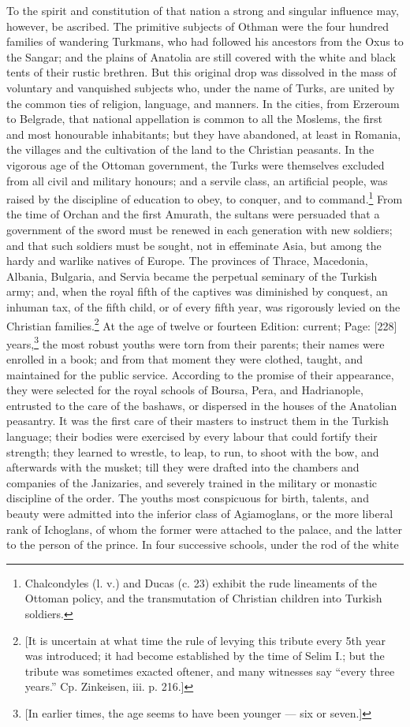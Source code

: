 To the spirit and constitution of that nation a strong and singular influence may, however, be ascribed. The primitive subjects of Othman were the four hundred families of wandering Turkmans, who had followed his ancestors from the Oxus to the Sangar; and the plains of Anatolia are still covered with the white and black tents of their rustic brethren. But this original drop was dissolved in the mass of voluntary and vanquished subjects who, under the name of Turks, are united by the common ties of religion, language, and manners. In the cities, from Erzeroum to Belgrade, that national appellation is common to all the Moslems, the first and most honourable inhabitants; but they have abandoned, at least in Romania, the villages and the cultivation of the land to the Christian peasants. In the vigorous age of the Ottoman government, the Turks were themselves excluded from all civil and military honours; and a servile class, an artificial people, was raised by the discipline of education to obey, to conquer, and to command.\footnote{Chalcondyles (l. v.) and Ducas (c. 23) exhibit the rude lineaments of the Ottoman policy, and the transmutation of Christian children into Turkish soldiers.} From the time of Orchan and the first Amurath, the sultans were persuaded that a government of the sword must be renewed in each generation with new soldiers; and that such soldiers must be sought, not in effeminate Asia, but among the hardy and warlike natives of Europe. The provinces of Thrace, Macedonia, Albania, Bulgaria, and Servia became the perpetual seminary of the Turkish army; and, when the royal fifth of the captives was diminished by conquest, an inhuman tax, of the fifth child, or of every fifth year, was rigorously levied on the Christian families.\footnote{[It is uncertain at what time the rule of levying this tribute every 5th year was introduced; it had become established by the time of Selim I.; but the tribute was sometimes exacted oftener, and many witnesses say \texthebrew{“}every three years.\texthebrew{}” Cp. Zinkeisen, iii. p. 216.]} At the age of twelve or fourteen Edition: current; Page: [228] years,\footnote{[In earlier times, the age seems to have been younger \texthebrew{—} six or seven.]} the most robust youths were torn from their parents; their names were enrolled in a book; and from that moment they were clothed, taught, and maintained for the public service. According to the promise of their appearance, they were selected for the royal schools of Boursa, Pera, and Hadrianople, entrusted to the care of the bashaws, or dispersed in the houses of the Anatolian peasantry. It was the first care of their masters to instruct them in the Turkish language; their bodies were exercised by every labour that could fortify their strength; they learned to wrestle, to leap, to run, to shoot with the bow, and afterwards with the musket; till they were drafted into the chambers and companies of the Janizaries, and severely trained in the military or monastic discipline of the order. The youths most conspicuous for birth, talents, and beauty were admitted into the inferior class of Agiamoglans, or the more liberal rank of Ichoglans, of whom the former were attached to the palace, and the latter to the person of the prince. In four successive schools, under the rod of the white 